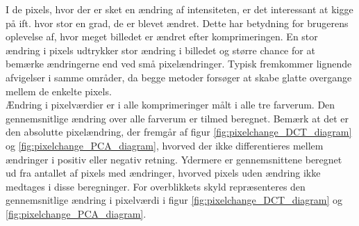 I de pixels, hvor der er sket en ændring af intensiteten, er det interessant at kigge på ift. hvor stor en grad, de er blevet ændret. Dette har betydning for brugerens oplevelse af, hvor meget billedet er ændret efter komprimeringen. En stor ændring i pixels udtrykker stor ændring i billedet og større chance for at bemærke ændringerne end ved små pixelændringer. Typisk fremkommer lignende afvigelser i samme områder, da begge metoder forsøger at skabe glatte overgange mellem de enkelte pixels.\\
Ændring i pixelværdier er i alle komprimeringer målt i alle tre farverum. Den gennemsnitlige ændring over alle farverum er tilmed beregnet. Bemærk at det er den absolutte pixelændring, der fremgår af figur \ref{fig:pixelchange_DCT_diagram} og \vref{fig:pixelchange_PCA_diagram}, hvorved der ikke differentieres mellem ændringer i positiv eller negativ retning. Ydermere er gennemsnittene beregnet ud fra antallet af pixels med ændringer, hvorved pixels uden ændring ikke medtages i disse beregninger.
For overblikkets skyld repræsenteres den gennemsnitlige ændring i pixelværdi i figur \ref{fig:pixelchange_DCT_diagram} og \ref{fig:pixelchange_PCA_diagram}.
%	
%
